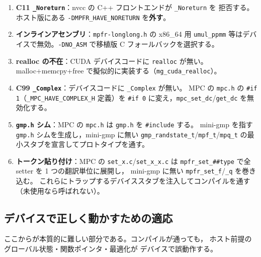 \documentclass[uplatex,dvipdfmx,a4paper,11pt]{jsarticle}
\newcommand{\code}[1]{\texttt{#1}}
\begin{document}
\begin{enumerate}
\item \textbf{C11 \code{\_Noreturn}}：nvcc の C++ フロントエンドが \code{\_Noreturn} を
      拒否する。ホスト版にある \code{-DMPFR\_HAVE\_NORETURN} を\textbf{外す}。
\item \textbf{インラインアセンブリ}：\code{mpfr-longlong.h} の x86\_64 用 \code{umul\_ppmm}
      等はデバイスで無効。\code{-DNO\_ASM} で移植版 C フォールバックを選択する。
\item \textbf{realloc の不在}：CUDA デバイスコードに \code{realloc} が無い。
      malloc+memcpy+free で擬似的に実装する（\code{mg\_cuda\_realloc}）。
\item \textbf{C99 \code{\_Complex}}：デバイスコードに \code{\_Complex} が無い。
      MPC の \code{mpc.h} の \code{\#if 1}（\code{\_MPC\_HAVE\_COMPLEX\_H} 定義）を
      \code{\#if 0} に変え，\code{mpc\_set\_dc}/\code{get\_dc} を無効化する。
\item \textbf{\code{gmp.h} シム}：MPC の \code{mpc.h} は \code{gmp.h} を \code{\#include} する。
      mini-gmp を指す \code{gmp.h} シムを生成し，mini-gmp に無い
      \code{gmp\_randstate\_t}/\code{mpf\_t}/\code{mpq\_t} の最小スタブを宣言してプロトタイプを通す。
\item \textbf{トークン貼り付け}：MPC の \code{set\_x.c}/\code{set\_x\_x.c} は
      \code{mpfr\_set\_\#\#type} で全 setter を 1 つの翻訳単位に展開し，
      mini-gmp に無い \code{mpfr\_set\_f}/\code{\_q} を巻き込む。
      これらにトラップするデバイススタブを注入してコンパイルを通す（未使用なら呼ばれない）。
\end{enumerate}

\subsection{デバイスで正しく動かすための適応}

ここからが本質的に難しい部分である。コンパイルが通っても，
ホスト前提のグローバル状態・関数ポインタ・最適化が
デバイスで誤動作する。
\end{document}
